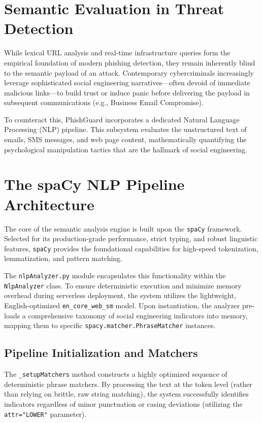 \section{Semantic Evaluation in Threat
Detection}\label{semantic-evaluation-in-threat-detection}

While lexical URL analysis and real-time infrastructure queries form the
empirical foundation of modern phishing detection, they remain
inherently blind to the semantic payload of an attack. Contemporary
cybercriminals increasingly leverage sophisticated social engineering
narratives---often devoid of immediate malicious links---to build trust
or induce panic before delivering the payload in subsequent
communications (e.g., Business Email Compromise).

To counteract this, PhishGuard incorporates a dedicated Natural Language
Processing (NLP) pipeline. This subsystem evaluates the unstructured
text of emails, SMS messages, and web page content, mathematically
quantifying the psychological manipulation tactics that are the hallmark
of social engineering.

\section{The spaCy NLP Pipeline
Architecture}\label{the-spacy-nlp-pipeline-architecture}

The core of the semantic analysis engine is built upon the
\texttt{spaCy} framework. Selected for its production-grade performance,
strict typing, and robust linguistic features, \texttt{spaCy} provides
the foundational capabilities for high-speed tokenization,
lemmatization, and pattern matching.

The \texttt{nlpAnalyzer.py} module encapsulates this functionality
within the \texttt{NlpAnalyzer} class. To ensure deterministic execution
and minimize memory overhead during serverless deployment, the system
utilizes the lightweight, English-optimized \texttt{en\_core\_web\_sm}
model. Upon instantiation, the analyzer pre-loads a comprehensive
taxonomy of social engineering indicators into memory, mapping them to
specific \texttt{spacy.matcher.PhraseMatcher} instances.

\subsection{Pipeline Initialization and
Matchers}\label{pipeline-initialization-and-matchers}

The \texttt{\_setupMatchers} method constructs a highly optimized
sequence of deterministic phrase matchers. By processing the text at the
token level (rather than relying on brittle, raw string matching), the
system successfully identifies indicators regardless of minor
punctuation or casing deviations (utilizing the \texttt{attr="LOWER"}
parameter).

